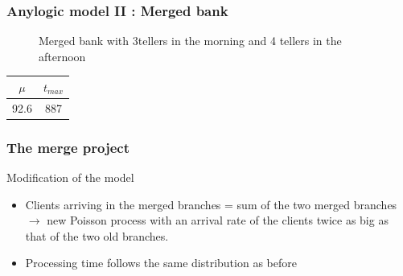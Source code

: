 \documentclass[10pt]{beamer}
\begin{document}
\begin{frame}
  \frametitle{Anylogic model II : Merged bank}
  \begin{figure}
  \centering
{}

\caption{Merged bank with 3tellers in the morning and 4 tellers in the afternoon}
\end{figure}
  
  
\begin{table}
\centering
\begin{tabular}{|c|c|}
\hline
$\mu$ & $t_{max}$ \\
\hline
92.6 & 887 \\
\hline
\end{tabular} 
\end{table}

\end{frame}




\begin{frame}
  \frametitle{The merge project}
  \begin{block}{Modification of the model}
  \begin{itemize}
  \item  Clients arriving in the merged branches = sum of the two merged branches
  $\rightarrow $ new Poisson process with an arrival rate of the clients twice as big as that of the two old branches.
  \item Processing time follows the same distribution as before
  \end{itemize}
  \end{block}
 
\end{frame}
\end{document}
